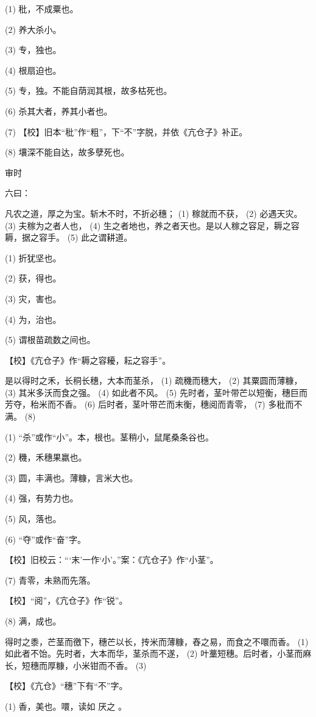 \documentclass[12pt,UTF8]{ctexbook}
\begin{document}
(1) 秕，不成粟也。

(2) 养大杀小。

(3) 专，独也。

(4) 根扇迫也。

(5) 专，独。不能自荫润其根，故多枯死也。

(6) 杀其大者，养其小者也。

(7) 【校】旧本“秕”作“粗”，下“不”字脱，并依《亢仓子》补正。

(8) 壤深不能自达，故多孽死也。





审时


六曰：

凡农之道，厚之为宝。斩木不时，不折必穗； (1) 稼就而不获， (2) 必遇天灾。 (3) 夫稼为之者人也， (4) 生之者地也，养之者天也。是以人稼之容足，耨之容耨，据之容手。 (5) 此之谓耕道。

(1) 折犹坚也。

(2) 获，得也。

(3) 灾，害也。

(4) 为，治也。

(5) 谓根苗疏数之间也。

【校】《亢仓子》作“耨之容耰，耘之容手”。

是以得时之禾，长秱长穗，大本而茎杀， (1) 疏穖而穗大， (2) 其粟圆而薄糠， (3) 其米多沃而食之强。 (4) 如此者不风。 (5) 先时者，茎叶带芒以短衡，穗巨而芳夺，秮米而不香。 (6) 后时者，茎叶带芒而末衡，穗阅而青零， (7) 多秕而不满。 (8)

(1) “杀”或作“小”。本，根也。茎稍小，鼠尾桑条谷也。

(2) 穖，禾穗果羸也。

(3) 圆，丰满也。薄糠，言米大也。

(4) 强，有势力也。

(5) 风，落也。

(6) “夺”或作“奋”字。

【校】旧校云：“‘末’一作‘小’。”案：《亢仓子》作“小茎”。

(7) 青零，未熟而先落。

【校】“阅”，《亢仓子》作“锐”。

(8) 满，成也。

得时之黍，芒茎而徼下，穗芒以长，抟米而薄糠，舂之易，而食之不噮而香。 (1) 如此者不饴。先时者，大本而华，茎杀而不遂， (2) 叶藳短穗。后时者，小茎而麻长，短穗而厚糠，小米钳而不香。 (3)

【校】《亢仓》“穗”下有“不”字。

(1) 香，美也。噮，读如 厌之 。
\end{document}
